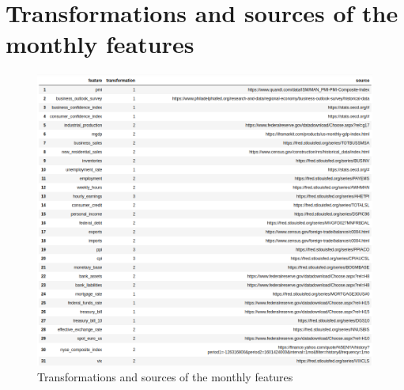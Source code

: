 \section{Transformations and sources of the monthly features}
\label{appendix2}

\begin{figure}[H]
	\centering
	\includegraphics[scale=0.62]{images/transformation_dataframe.png}
	\caption{Transformations and sources of the monthly features}
	\label{fig_c2_s3_1}
\end{figure}

\pagebreak